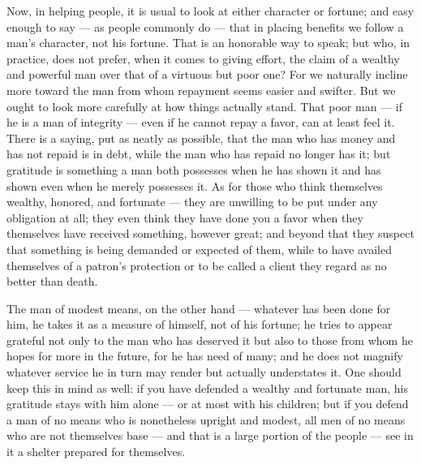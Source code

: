  Now, in helping people, it is usual to look at either character or fortune; and easy enough to say — as people commonly do — that in placing benefits we follow a man's character, not his fortune. That is an honorable way to speak; but who, in practice, does not prefer, when it comes to giving effort, the claim of a wealthy and powerful man over that of a virtuous but poor one? For we naturally incline more toward the man from whom repayment seems easier and swifter. But we ought to look more carefully at how things actually stand. That poor man — if he is a man of integrity — even if he cannot repay a favor, can at least feel it. There is a saying, put as neatly as possible, that the man who has money and has not repaid is in debt, while the man who has repaid no longer has it; but gratitude is something a man both possesses when he has shown it and has shown even when he merely possesses it. As for those who think themselves wealthy, honored, and fortunate — they are unwilling to be put under any obligation at all; they even think they have done you a favor when they themselves have received something, however great; and beyond that they suspect that something is being demanded or expected of them, while to have availed themselves of a patron's protection or to be called a client they regard as no better than death.

 The man of modest means, on the other hand — whatever has been done for him, he takes it as a measure of himself, not of his fortune; he tries to appear grateful not only to the man who has deserved it but also to those from whom he hopes for more in the future, for he has need of many; and he does not magnify whatever service he in turn may render but actually understates it. One should keep this in mind as well: if you have defended a wealthy and fortunate man, his gratitude stays with him alone — or at most with his children; but if you defend a man of no means who is nonetheless upright and modest, all men of no means who are not themselves base — and that is a large portion of the people — see in it a shelter prepared for themselves.


